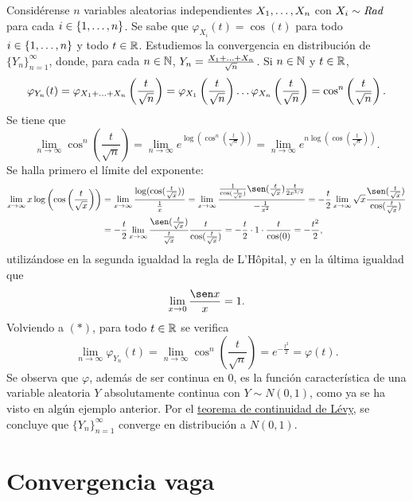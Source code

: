\documentclass[a4paper, 11pt, extrafontsizes]{memoir}
\begin{document}
    \begin{example}
        Considérense $n$ variables aleatorias independientes $X_1,\mathellipsis,X_n$ con $X_i \sim \textup{\emph{Rad}}$ para cada $i \in \{1,\mathellipsis,n\}$. Se sabe que $\varphi_{X_i}(t) = \cos(t)$ para todo $i \in \{1,\mathellipsis,n\}$ y todo $t \in \mathbb R$. Estudiemos la convergencia en distribución de $\{Y_n\}_{n=1}^\infty$, donde, para cada $n \in \mathbb N$, $Y_n = \frac{X_1+\mathellipsis+X_n}{\sqrt{n}}$. Si $n \in \mathbb N$ y $t \in \mathbb R$,
        \[\varphi_{Y_n}(t) = \varphi_{X_1+\mathellipsis+X_n}\left(\frac{t}{\sqrt{n}}\right) = \varphi_{X_1}\left(\frac{t}{\sqrt{n}}\right)\mathellipsis \varphi_{X_n}\left(\frac{t}{\sqrt{n}}\right) =\cos^n \left(\frac{t}{\sqrt{n}}\right).\]
        Se tiene que
        \[\lim_{n \to \infty} \cos^n\left(\frac{t}{\sqrt{n}}\right) = \lim_{n \to \infty} e^{\log(\cos^n(\frac{t}{\sqrt{n}}))} = \lim_{n \to \infty} e^{n\log(\cos(\frac{t}{\sqrt{n}}))}. \tag{$\ast$}\]
        Se halla primero el límite del exponente:
        \[\begin{aligned}[t]
            \lim_{x \to \infty} x\log\left(\cos\left(\frac{t}{\sqrt{x}}\right)\right) &= \lim_{x \to \infty} \frac{\log(\cos(\frac{t}{\sqrt{x}}))}{\frac{1}{x}} 
            = \lim_{x \to \infty} \frac{\frac{1}{\cos(\frac{t}{\sqrt{x}})}\sen(\frac{t}{\sqrt{x}})\frac{t}{2x^{3/2}}}{-\frac{1}{x^2}} =-\frac{t}{2} \lim_{x \to \infty}\sqrt{x}\frac{\sen(\frac{t}{\sqrt{x}})}{\cos(\frac{t}{\sqrt{x}})} \\
            &= -\frac{t}{2}\lim_{x \to \infty} \frac{\sen(\frac{t}{\sqrt{x}})}{\frac{t}{\sqrt{x}}} \frac{t}{\cos(\frac{t}{\sqrt{x}})} = -\frac{t}{2} \cdot 1 \cdot \frac{t}{\cos(0)} = -\frac{t^2}{2},
        \end{aligned}
        \]
        utilizándose en la segunda igualdad la regla de L'Hôpital, y en la última igualdad que
        \[\lim_{x \to 0} \frac{\sen x}{x} = 1.\]
        Volviendo a $(\ast)$, para todo $t \in \mathbb R$ se verifica
        \[\lim_{n \to \infty} \varphi_{Y_n}(t) =\lim_{n \to \infty} \cos^n\left(\frac{t}{\sqrt{n}}\right)=e^{-\frac{t^2}{2}} = \varphi(t).\]
        Se observa que $\varphi$, además de ser continua en $0$, es la función característica de una variable aleatoria $Y$ absolutamente continua con $Y \sim N(0,1)$, como ya se ha visto en algún ejemplo anterior. Por el \hyperref[teo:1.9.30]{\color{gray}teorema de continuidad de Lévy}, se concluye que $\{Y_n\}_{n=1}^\infty$ converge en distribución a $N(0,1)$.
    \end{example}

    \section{Convergencia vaga}
\end{document}
